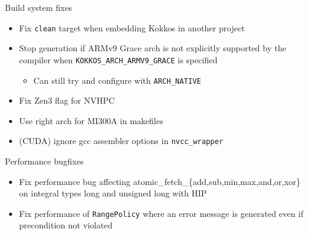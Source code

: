 \begin{frame}[fragile]{Build system fixes}
  \begin{itemize}
      \item Fix \texttt{clean} target when embedding Kokkos in another project
      \item Stop generation if ARMv9 Grace arch is not explicitly supported by the compiler when \texttt{KOKKOS\_ARCH\_ARMV9\_GRACE} is specified
      \begin{itemize}
        \item Can still try and configure with \texttt{ARCH\_NATIVE}
      \end{itemize}
      \item Fix Zen3 flag for NVHPC
      \item Use right arch for MI300A in makefiles
      \item (CUDA) ignore gcc assembler options in \texttt{nvcc\_wrapper}
  \end{itemize}
 \end{frame}

\begin{frame}[fragile]{Performance bugfixes}
 \begin{itemize}
     \item Fix performance bug affecting atomic\_fetch\_\{add,sub,min,max,and,or,xor\} on integral types long and unsigned long with HIP
     \item Fix performance of \texttt{RangePolicy} where an error message is generated even if precondition not violated
 \end{itemize}
\end{frame}




